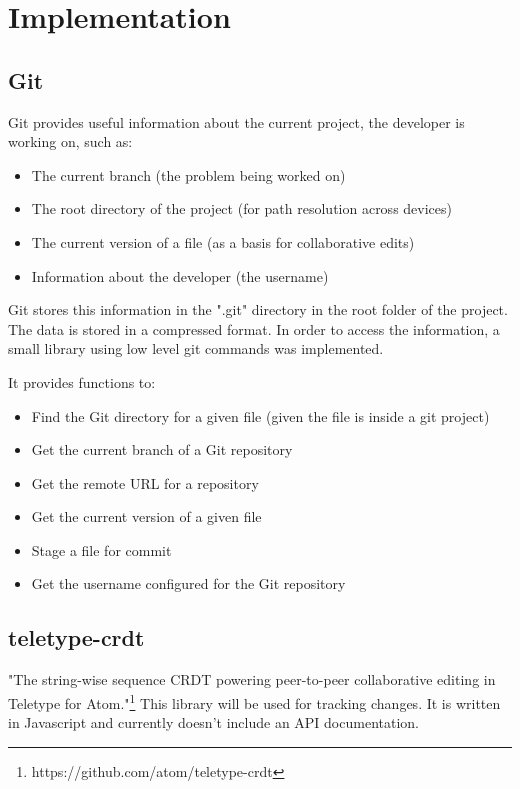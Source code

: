 \chapter{Implementation}

\section{Git}

Git provides useful information about the current project, the developer is working on, such as:
\begin{itemize}
    \item The current branch (the problem being worked on)
    \item The root directory of the project (for path resolution across devices)
    \item The current version of a file (as a basis for collaborative edits)
    \item Information about the developer (the username)
\end{itemize}

Git stores this information in the ".git" directory in the root folder of the project.
The data is stored in a compressed format. In order to access the information, a small library using low level git commands was implemented. 

It provides functions to:
\begin{itemize}
    \item Find the Git directory for a given file (given the file is inside a git project)
    \item Get the current branch of a Git repository
    \item Get the remote URL for a repository
    \item Get the current version of a given file
    \item Stage a file for commit
    \item Get the username configured for the Git repository
\end{itemize}

\section{teletype-crdt}

"The string-wise sequence CRDT powering peer-to-peer collaborative editing in Teletype for Atom."\footnote{https://github.com/atom/teletype-crdt}
This library will be used for tracking changes. It is written in Javascript and currently doesn't include an API documentation.

